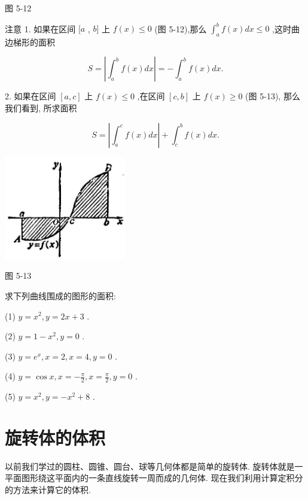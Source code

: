 \documentclass[lang=cn,newtx,10pt,scheme=chinese]{elegantbook}
\begin{document}
图 5-12

注意 1. 如果在区间 \(\lbrack a\) , \(b\rbrack\) 上 \(f\left( x\right) \leq 0\) (图 5-12),那么 \({\int }_{a}^{b}f\left( x\right) {dx} \leq 0\) ,这时曲边梯形的面积

\[
S = \left| {{\int }_{a}^{b}f\left( x\right) {dx}}\right| = - {\int }_{a}^{b}f\left( x\right) {dx}.
\]

2. 如果在区间 \(\left\lbrack {a,c}\right\rbrack\) 上 \(f\left( x\right) \leq 0\) ,在区间 \(\left\lbrack {c,b}\right\rbrack\) 上 \(f\left( x\right) \geq 0\) (图 5-13), 那么我们看到, 所求面积

\[
S = \left| {{\int }_{a}^{c}f\left( x\right) {dx}}\right| + {\int }_{c}^{b}f\left( x\right) {dx}.
\]

\begin{center}
\includegraphics[max width=0.4\textwidth]{images/01912c18-5c3f-733d-b775-749ba9897a9d_235_691141.jpg}
\end{center}

图 5-13

\begin{problemset}[练习]

\item 求下列曲线围成的图形的面积:

(1) \(y = {x}^{2},y = {2x} + 3\) .

(2) \(y = 1 - {x}^{2},y = 0\) .

(3) \(y = {e}^{x},x = 2,x = 4,y = 0\) .

(4) \(y = \cos x,x = - \frac{\pi }{2},x = \frac{\pi }{2},y = 0\) .

(5) \(y = {x}^{2},y = - {x}^{2} + 8\) .

\end{problemset}

\section{旋转体的体积}

以前我们学过的圆柱、圆锥、圆台、球等几何体都是简单的旋转体. 旋转体就是一平面图形绕这平面内的一条直线旋转一周而成的几何体. 现在我们利用计算定积分的方法来计算它的体积.
\end{document}
